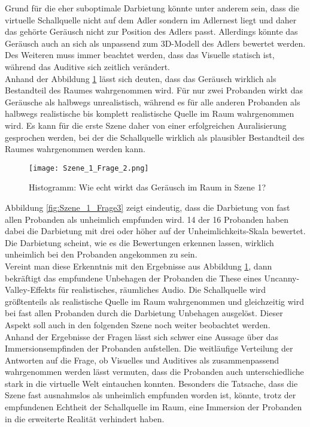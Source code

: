 Grund für die eher suboptimale Darbietung könnte unter anderem sein, dass die virtuelle Schallquelle nicht auf dem Adler sondern im Adlernest liegt und daher das gehörte Geräusch nicht zur Position des Adlers passt. Allerdings könnte das Geräusch auch an sich als unpassend zum 3D-Modell des Adlers bewertet werden. Des Weiteren muss immer beachtet werden, dass das Visuelle statisch ist, während das Auditive sich zeitlich verändert. \\ 

Anhand der Abbildung \ref{fig:Szene_1_Frage2} lässt sich deuten, dass das Geräusch wirklich als Bestandteil des Raumes wahrgenommen wird. Für nur zwei Probanden wirkt das Geräusche als halbwegs unrealistisch, während es für alle anderen Probanden als halbwegs realistische bis komplett realistische Quelle im Raum wahrgenommen wird. Es kann für die erste Szene daher von einer erfolgreichen Auralisierung gesprochen werden, bei der die Schallquelle wirklich als plausibler Bestandteil des Raumes wahrgenommen werden kann. 

   \begin{figure}[H]
\centering
\texttt{[image: Szene\_1\_Frage\_2.png]}
\caption{Histogramm: Wie echt wirkt das Geräusch im Raum in Szene 1?}
\label{fig:Szene_1_Frage2}
\end{figure} 

Abbildung \ref{fig:Szene_1_Frage3} zeigt eindeutig, dass die Darbietung von fast allen Probanden als unheimlich empfunden wird. 14 der 16 Probanden haben dabei die Darbietung mit drei oder höher auf der \glqq Unheimlichkeits\grqq{}-Skala bewertet. Die Darbietung scheint, wie es die Bewertungen erkennen lassen, wirklich unheimlich bei den Probanden angekommen zu sein.\\

Vereint man diese Erkenntnis mit den Ergebnisse aus Abbildung \ref{fig:Szene_1_Frage2}, dann bekräftigt das empfundene Unbehagen der Probanden die These eines \glqq Uncanny-Valley\grqq{}-Effekts für realistisches, räumliches Audio. Die Schallquelle wird größtenteils als realistische Quelle im Raum wahrgenommen und gleichzeitig wird bei fast allen Probanden durch die Darbietung Unbehagen ausgelöst. Dieser Aspekt soll auch in den folgenden Szene noch weiter beobachtet werden. \\

Anhand der Ergebnisse der Fragen lässt sich schwer eine Aussage über das Immersionsempfinden der Probanden aufstellen. Die weitläufige Verteilung der Antworten auf die Frage, ob Visuelles und Auditives als zusammenpassend wahrgenommen werden lässt vermuten, dass die Probanden auch unterschiedliche stark in die virtuelle Welt eintauchen konnten. Besonders die Tatsache, dass die Szene fast ausnahmslos als unheimlich empfunden worden ist, könnte, trotz der empfundenen Echtheit der Schallquelle im Raum, eine Immersion der Probanden in die erweiterte Realität verhindert haben. \\


